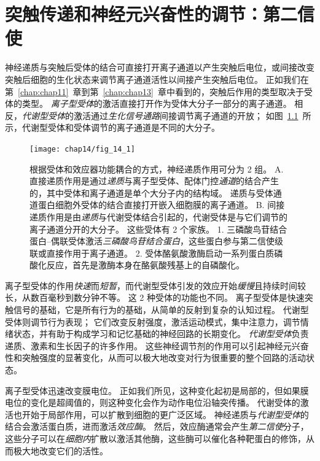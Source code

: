 \chapter{突触传递和神经元兴奋性的调节：第二信使} \label{chap:chap14}

神经递质与突触后受体的结合可直接打开离子通道以产生突触后电位，或间接改变突触后细胞的生化状态来调节离子通道活性以间接产生突触后电位。
正如我们在第~\ref{chap:chap11}~章到第~\ref{chap:chap13}~章中看到的，突触后作用的类型取决于受体的类型。
\textit{离子型受体}的激活直接打开作为受体大分子一部分的离子通道。
相反，\textit{代谢型受体}的激活通过\textit{生化信号通路}间接调节离子通道的开放；
如图~\ref{fig:14_1}~所示，代谢型受体和受体调节的离子通道是不同的大分子。


\begin{figure}[htbp]
	\centering
	\texttt{[image: chap14/fig\_14\_1]}
	\caption{根据受体和效应器功能耦合的方式，神经递质作用可分为 2 组。
		A. 直接递质作用是通过\textit{递质}与离子型受体、配体门控\textit{通道}的结合产生的，其中受体和离子通道是单个大分子内的结构域。
		递质与受体通道蛋白细胞外受体的结合直接打开嵌入细胞膜的离子通道。
		B. 间接递质作用是由\textit{递质}与代谢受体结合引起的，代谢受体是与它们调节的离子通道分开的大分子。
		这些受体有 2 个家族。
		1. 三磷酸鸟苷结合蛋白–偶联受体激活\textit{三磷酸鸟苷结合蛋白}，这些蛋白参与第二信使级联或直接作用于离子通道。
		2. 受体酪氨酸激酶启动一系列蛋白质磷酸化反应，首先是激酶本身在酪氨酸残基上的自磷酸化。}
	\label{fig:14_1}
\end{figure}


离子型受体的作用\textit{快速}而\textit{短暂}，而代谢型受体引发的效应开始\textit{缓慢}且持续时间较长，从数百毫秒到数分钟不等。
这 2 种受体的功能也不同。
离子型受体是快速突触信号的基础，它是所有行为的基础，从简单的反射到复杂的认知过程。
代谢型受体则调节行为表现；
它们改变反射强度，激活运动模式，集中注意力，调节情绪状态，并有助于构成学习和记忆基础的神经回路的长期变化。
\textit{代谢型受体}负责递质、激素和生长因子的许多作用。
这些神经调节剂的作用可以引起神经元兴奋性和突触强度的显著变化，从而可以极大地改变对行为很重要的整个回路的活动状态。


离子型受体迅速改变膜电位。
正如我们所见，这种变化起初是局部的，但如果膜电位的变化是超阈值的，则这种变化会作为动作电位沿轴突传播。
代谢受体的激活也开始于局部作用，可以扩散到细胞的更广泛区域。
神经递质与\textit{代谢型受体}的结合会激活蛋白质，进而激活\textit{效应酶}。
然后，效应酶通常会产生\textit{第二信使}分子，这些分子可以在\textit{细胞内}扩散以激活其他酶，这些酶可以催化各种靶蛋白的修饰，从而极大地改变它们的活性。


